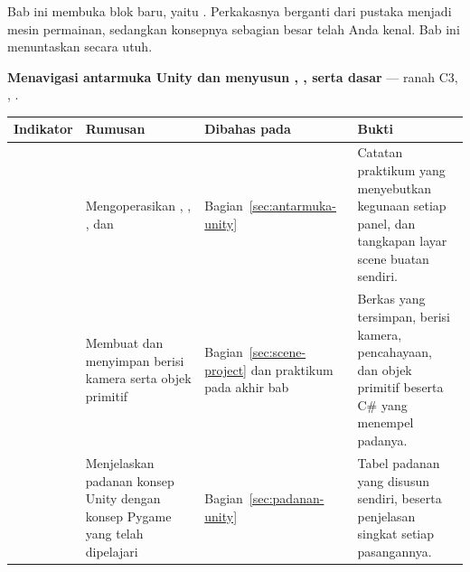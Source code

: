 \begin{subcpmkbox}
Bab ini membuka blok baru, yaitu . Perkakasnya berganti dari pustaka
menjadi mesin permainan, sedangkan konsepnya sebagian besar telah Anda kenal.
Bab ini menuntaskan  secara utuh.

\vspace{0.5em}
\textbf{ Menavigasi antarmuka Unity dan menyusun
, , serta  dasar} ---
ranah C3, , .

\vspace{0.5em}
{\setlength{\tabcolsep}{4pt}\footnotesize%
\begin{tabularx}{\textwidth}{@{}C{1.9cm} L{4.0cm} L{2.5cm} Y@{}}
\toprule
\headrow \textbf{Indikator} & \textbf{Rumusan} & \textbf{Dibahas pada} & \textbf{Bukti} \\
\midrule
{} & Mengoperasikan , ,
, dan  &
Bagian~\ref{sec:antarmuka-unity} &
Catatan praktikum yang menyebutkan kegunaan setiap panel, dan tangkapan layar
scene buatan sendiri. \\
\addlinespace
{} & Membuat dan menyimpan  berisi kamera serta objek
primitif &
Bagian~\ref{sec:scene-project} dan praktikum pada akhir bab &
Berkas  yang tersimpan, berisi kamera, pencahayaan, dan objek
primitif beserta  C\# yang menempel padanya. \\
\addlinespace
{} & Menjelaskan padanan konsep Unity dengan konsep Pygame yang telah
dipelajari &
Bagian~\ref{sec:padanan-unity} &
Tabel padanan yang disusun sendiri, beserta penjelasan singkat setiap
pasangannya. \\
\bottomrule
\end{tabularx}}
\end{subcpmkbox}
